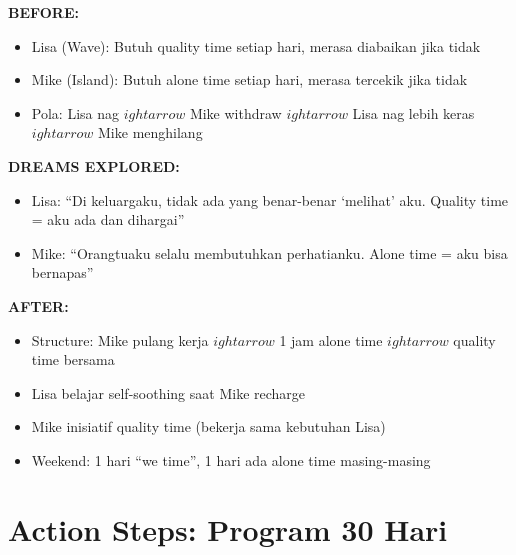 \begin{praktikbox}
\textbf{BEFORE:}
\begin{itemize}
    \item Lisa (Wave): Butuh quality time setiap hari, merasa diabaikan jika tidak
    \item Mike (Island): Butuh alone time setiap hari, merasa tercekik jika tidak
    \item Pola: Lisa nag $
ightarrow$ Mike withdraw $
ightarrow$ Lisa nag lebih keras $
ightarrow$ Mike menghilang
\end{itemize}

\textbf{DREAMS EXPLORED:}
\begin{itemize}
    \item Lisa: ``Di keluargaku, tidak ada yang benar-benar `melihat' aku. Quality time = aku ada dan dihargai''
    \item Mike: ``Orangtuaku selalu membutuhkan perhatianku. Alone time = aku bisa bernapas''
\end{itemize}

\textbf{AFTER:}
\begin{itemize}
    \item Structure: Mike pulang kerja $
ightarrow$ 1 jam alone time $
ightarrow$ quality time bersama
    \item Lisa belajar self-soothing saat Mike recharge
    \item Mike inisiatif quality time (bekerja sama kebutuhan Lisa)
    \item Weekend: 1 hari ``we time'', 1 hari ada alone time masing-masing
\end{itemize}
\end{praktikbox}

\section{Action Steps: Program 30 Hari}

